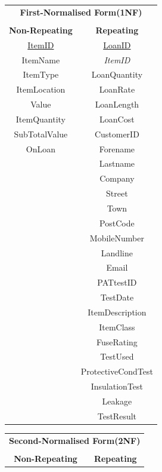 \begin{center}
    \begin{tabular}{|c|c|}
        \hline
        \multicolumn{2}{|c|}{\textbf{First-Normalised Form(1NF)}}\\
        \multicolumn{2}{|c|}{ }\\ \hline
        \textbf{Non-Repeating} & \textbf{Repeating}\\ \hline
        \underline{ItemID }& \underline{LoanID }\\ 
        ItemName & \emph{ItemID} \\ 
        ItemType & LoanQuantity \\ 
        ItemLocation & LoanRate\\ 
        Value & LoanLength \\ 
        ItemQuantity & LoanCost \\ 
        SubTotalValue & CustomerID \\ 
        OnLoan &  Forename \\ 
         & Lastname \\ 
         & Company \\ 
         & Street \\ 
         & Town \\ 
         & PostCode \\ 
         & MobileNumber \\ 
         & Landline \\ 
         & Email \\ 
         & PATtestID \\ 
         & TestDate \\ 
         & ItemDescription \\ 
         & ItemClass \\ 
         & FuseRating \\ 
         & TestUsed \\ 
         & ProtectiveCondTest \\ 
         & InsulationTest \\ 
         & Leakage  \\ 
         & TestResult \\ \hline
    \end{tabular}
\end{center}

\newpage

\begin{center}
    \begin{tabular}{|c|c|}
        \hline
        \multicolumn{2}{|c|}{\textbf{Second-Normalised Form(2NF)}}\\
        \multicolumn{2}{|c|}{ }\\ \hline
        \textbf{Non-Repeating} & \textbf{Repeating}\\ \hline
        
    \end{tabular}
\end{center}

